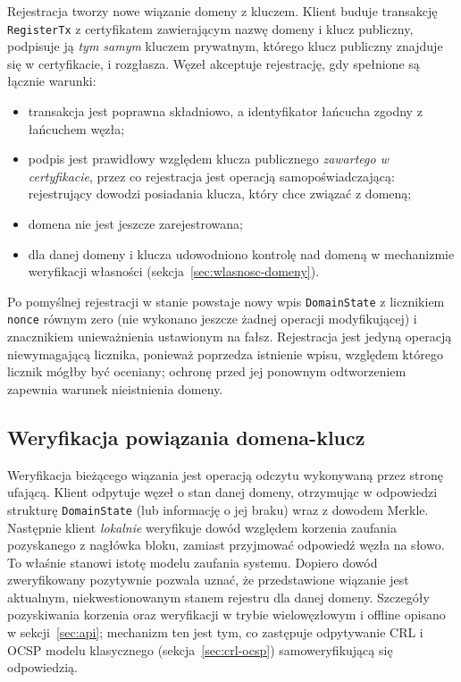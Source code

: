 Rejestracja tworzy nowe wiązanie domeny z kluczem. Klient buduje transakcję \texttt{RegisterTx} z certyfikatem zawierającym nazwę domeny i klucz publiczny, podpisuje ją \emph{tym samym} kluczem prywatnym, którego klucz publiczny znajduje się w certyfikacie, i rozgłasza. Węzeł akceptuje rejestrację, gdy spełnione są łącznie warunki:
\begin{itemize}
    \item transakcja jest poprawna składniowo, a identyfikator łańcucha zgodny z łańcuchem węzła;
    \item podpis jest prawidłowy względem klucza publicznego \emph{zawartego w certyfikacie}, przez co rejestracja jest operacją samopoświadczającą: rejestrujący dowodzi posiadania klucza, który chce związać z domeną;
    \item domena nie jest jeszcze zarejestrowana;
    \item dla danej domeny i klucza udowodniono kontrolę nad domeną w mechanizmie weryfikacji własności (sekcja~\ref{sec:wlasnosc-domeny}).
\end{itemize}

Po pomyślnej rejestracji w stanie powstaje nowy wpis \texttt{DomainState} z licznikiem \texttt{nonce} równym zero (nie wykonano jeszcze żadnej operacji modyfikującej) i znacznikiem unieważnienia ustawionym na fałsz. Rejestracja jest jedyną operacją niewymagającą licznika, ponieważ poprzedza istnienie wpisu, względem którego licznik mógłby być oceniany; ochronę przed jej ponownym odtworzeniem zapewnia warunek nieistnienia domeny.

\subsection{Weryfikacja powiązania domena-klucz}
\label{subsec:weryfikacja}

Weryfikacja bieżącego wiązania jest operacją odczytu wykonywaną przez stronę ufającą. Klient odpytuje węzeł o stan danej domeny, otrzymując w odpowiedzi strukturę \texttt{DomainState} (lub informację o jej braku) wraz z dowodem Merkle. Następnie klient \emph{lokalnie} weryfikuje dowód względem korzenia zaufania pozyskanego z nagłówka bloku, zamiast przyjmować odpowiedź węzła na słowo. To właśnie stanowi istotę modelu zaufania systemu. Dopiero dowód zweryfikowany pozytywnie pozwala uznać, że przedstawione wiązanie jest aktualnym, niekwestionowanym stanem rejestru dla danej domeny. Szczegóły pozyskiwania korzenia oraz weryfikacji w trybie wielowęzłowym i offline opisano w sekcji~\ref{sec:api}; mechanizm ten jest tym, co zastępuje odpytywanie CRL i OCSP modelu klasycznego (sekcja~\ref{sec:crl-ocsp}) samoweryfikującą się odpowiedzią.


